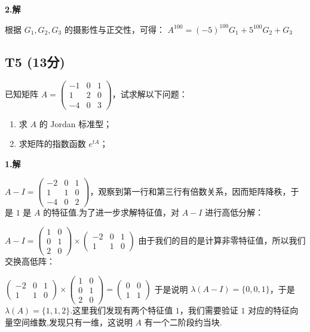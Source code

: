 \documentclass{article}
\begin{document}
\par \textbf{2.解}

根据 $G_1, G_2, G_3$ 的摄影性与正交性，可得： $A^{100}=(-5)^{100}G_1+5^{100}G_2 + G_3$

\subsection{T5 (13分)}

\par 已知矩阵 $A=\begin{pmatrix}
	-1 & 0 & 1\\
	1 & 2 & 0\\
	-4 & 0 & 3
\end{pmatrix}$，试求解以下问题：

\begin{enumerate}
	\item 求 $A$ 的 Jordan 标准型；
	\item 求矩阵的指数函数 $e^{tA}$；
\end{enumerate}

\par \textbf{1.解}

$A-I=\begin{pmatrix}
	-2 & 0 & 1\\
	1 & 1 & 0\\
	-4 & 0 & 2
\end{pmatrix}$，观察到第一行和第三行有倍数关系，因而矩阵降秩，于是 $1$ 是 $A$ 的特征值.为了进一步求解特征值，对 $A-I$ 进行高低分解：

$A-I=\begin{pmatrix}
	1 & 0\\
	0 & 1\\
	2 & 0
\end{pmatrix}\times \begin{pmatrix}
	-2 & 0 & 1\\
	1 & 1 & 0
\end{pmatrix}$ 由于我们的目的是计算非零特征值，所以我们交换高低阵：

$\begin{pmatrix}
	-2 & 0 & 1\\
	1 & 1 & 0
\end{pmatrix} \times \begin{pmatrix}
1 & 0\\
0 & 1\\
2 & 0
\end{pmatrix}=\begin{pmatrix}
	0 & 0\\
	1 & 1
\end{pmatrix}$ 于是说明 $\lambda(A-I)=\{0, 0, 1\}$，于是 $\lambda(A)=\{1, 1, 2\}$.这里我们发现有两个特征值 $1$，我们需要验证 $1$ 对应的特征向量空间维数,发现只有一维，这说明 $A$ 有一个二阶段约当块.
\end{document}
